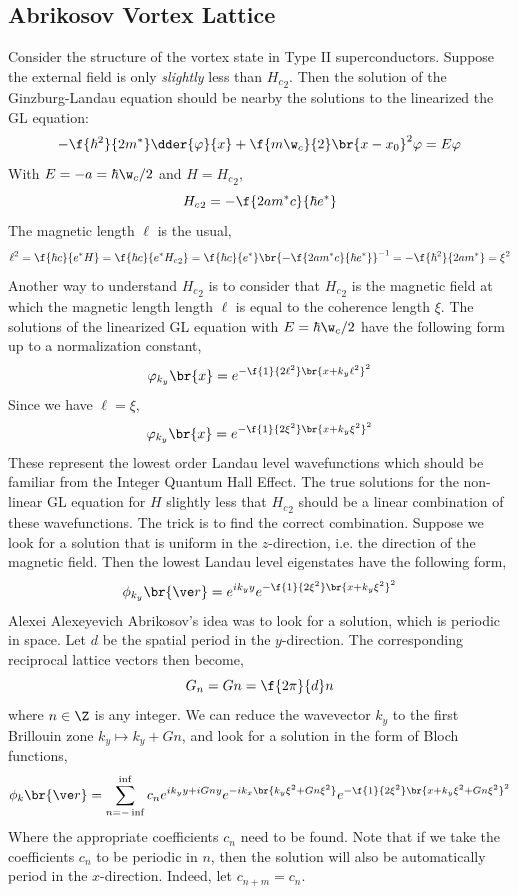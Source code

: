 \documentclass{article}
\newcommand{\vp}{\varphi}
\begin{document}
\subsection{Abrikosov Vortex Lattice}

Consider the structure of the vortex state in Type II superconductors. Suppose the external field is only \textit{slightly} less than ${H_{c}}_2$. Then the solution of the Ginzburg-Landau equation should be nearby the solutions to the linearized the GL equation:
\[ - \f{\hbar^2}{2 m^*} \dder{\vp}{x} + \f{m \w_{c}}{2} \br{x - x_0}^2 \vp = E \vp \]
With $E = - a = \hbar \w_c /2$ and $H = {H_{c}}_{2}$,
\[ {H_{c}}_2 = - \f{2am^{*}c}{\hbar e^{*}} \]
The magnetic length $\ell$ is the usual,
\[ \ell^2 = \f{\hbar c}{e^{*} H} = \f{\hbar c}{e^{*} {H_{c}}_{2}} = \f{\hbar c}{e^{*}}\br{- \f{2am^{*}c}{\hbar e^{*}}}^{-1} = -\f{\hbar^2}{2 a m^{*}} = \xi^2  \]
Another way to understand ${H_{c}}_2$ is to consider that ${H_{c}}_2$ is the magnetic field at which the magnetic length length $\ell$ is equal to the coherence length $\xi$. The solutions of the linearized GL equation with $E = \hbar \w_c / 2$ have the following form up to a normalization constant,
\[ \vp_{k_y}\br{x} = e^{-\f{1}{2\ell^2}\br{x + k_y \ell^2}^2} \]
Since we have $\ell = \xi$,
\[ \vp_{k_y}\br{x} = e^{-\f{1}{2\xi^2}\br{x + k_y \xi^2}^2} \]
These represent the lowest order Landau level wavefunctions which should be familiar from the Integer Quantum Hall Effect. The true solutions for the non-linear GL equation for $H$ slightly less that ${H_{c}}_2$ should be a linear combination of these wavefunctions. The trick is to find the correct combination. Suppose we look for a solution that is uniform in the $z$-direction, i.e. the direction of the magnetic field. Then the lowest Landau level eigenstates have the following form,
\[ \phi_{k_y}\br{\ve r} = e^{ik_y y}e^{-\f{1}{2\xi^2}\br{x + k_y \xi^2}^2} \]
Alexei Alexeyevich Abrikosov's idea was to look for a solution, which is periodic in space. Let $d$ be the spatial period in the $y$-direction. The corresponding reciprocal lattice vectors then become,
\[ G_{n} = Gn = \f{2\pi}{d}n \]
where $n \in \Z$ is any integer. We can reduce the wavevector $k_y$ to the first Brillouin zone $k_{y} \mapsto k_y + Gn$, and look for a solution in the form of Bloch functions,
\[ \phi_k\br{\ve r} = \sum_{n=-\inf}^{\inf} c_n e^{ik_y y + i Gn y}e^{-ik_x\br{k_y \xi^2 + G n \xi^2}} e^{-\f{1}{2 \xi^2} \br{x + k_y \xi^2 + G n \xi^2}^2} \]
Where the appropriate coefficients $c_n$ need to be found. Note that if we take the coefficients $c_n$ to be periodic in $n$, then the solution will also be automatically period in the $x$-direction. Indeed, let $c_{n+m} = c_n$.
\end{document}
